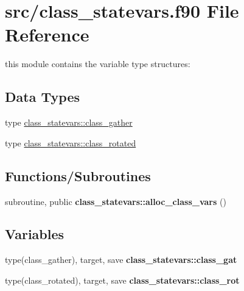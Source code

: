 \hypertarget{class__statevars_8f90}{}\section{src/class\+\_\+statevars.f90 File Reference}
\label{class__statevars_8f90}


this module contains the variable type structures\+:  


\subsection*{Data Types}
\begin{DoxyCompactItemize}
\item 
type \hyperlink{structclass__statevars_1_1class__gather}{class\+\_\+statevars\+::class\+\_\+gather}
\item 
type \hyperlink{structclass__statevars_1_1class__rotated}{class\+\_\+statevars\+::class\+\_\+rotated}
\end{DoxyCompactItemize}
\subsection*{Functions/\+Subroutines}
\begin{DoxyCompactItemize}
\item 
\hypertarget{namespaceclass__statevars_af3df7783fb08f2c4545e7af92fabe110}{}subroutine, public {\bfseries class\+\_\+statevars\+::alloc\+\_\+class\+\_\+vars} ()\label{namespaceclass__statevars_af3df7783fb08f2c4545e7af92fabe110}

\end{DoxyCompactItemize}
\subsection*{Variables}
\begin{DoxyCompactItemize}
\item 
\hypertarget{namespaceclass__statevars_a0b45bd6932fb64be34f0fce50f0f7f2e}{}type(class\+\_\+gather), target, save {\bfseries class\+\_\+statevars\+::class\+\_\+gat}\label{namespaceclass__statevars_a0b45bd6932fb64be34f0fce50f0f7f2e}

\item 
\hypertarget{namespaceclass__statevars_ad3ddcebdadd60cb255aa743257016f76}{}type(class\+\_\+rotated), target, save {\bfseries class\+\_\+statevars\+::class\+\_\+rot}\label{namespaceclass__statevars_ad3ddcebdadd60cb255aa743257016f76}

\end{DoxyCompactItemize}


